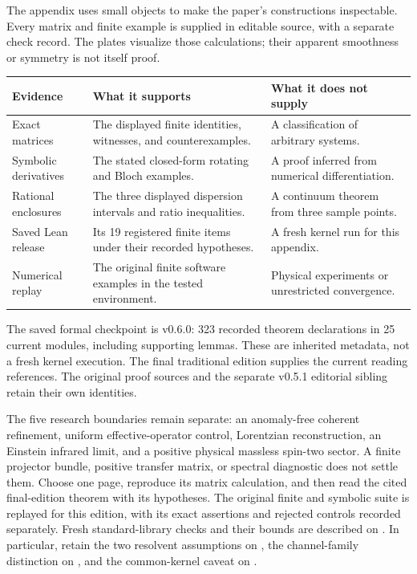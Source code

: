 The appendix uses small objects to make the paper's constructions inspectable. Every matrix and finite example is supplied in editable source, with a separate check record. The plates visualize those calculations; their apparent smoothness or symmetry is not itself proof.
\par\vspace{4pt}
\begin{tabularx}{\linewidth}{@{}p{.24\linewidth}YY@{}}
\toprule
Evidence & What it supports & What it does not supply\\\midrule
Exact matrices & The displayed finite identities, witnesses, and counterexamples. & A classification of arbitrary systems.\\
Symbolic derivatives & The stated closed-form rotating and Bloch examples. & A proof inferred from numerical differentiation.\\
Rational enclosures & The three displayed dispersion intervals and ratio inequalities. & A continuum theorem from three sample points.\\
Saved Lean release & Its 19 registered finite items under their recorded hypotheses. & A fresh kernel run for this appendix.\\
Numerical replay & The original finite software examples in the tested environment. & Physical experiments or unrestricted convergence.\\\bottomrule
\end{tabularx}
The saved formal checkpoint is v0.6.0: 323 recorded theorem declarations in 25 current modules, including supporting lemmas. These are inherited metadata, not a fresh kernel execution. The final traditional edition supplies the current reading references. The original proof sources and the separate v0.5.1 editorial sibling retain their own identities.

The five research boundaries remain separate: an anomaly-free coherent refinement, uniform effective-operator control, Lorentzian reconstruction, an Einstein infrared limit, and a positive physical massless spin-two sector. A finite projector bundle, positive transfer matrix, or spectral diagnostic does not settle them.
Choose one page, reproduce its matrix calculation, and then read the cited final-edition theorem with its hypotheses. The original finite and symbolic suite is replayed for this edition, with its exact assertions and rejected controls recorded separately. Fresh standard-library checks and their bounds are described on . In particular, retain the two resolvent assumptions on , the channel-family distinction on , and the common-kernel caveat on .

